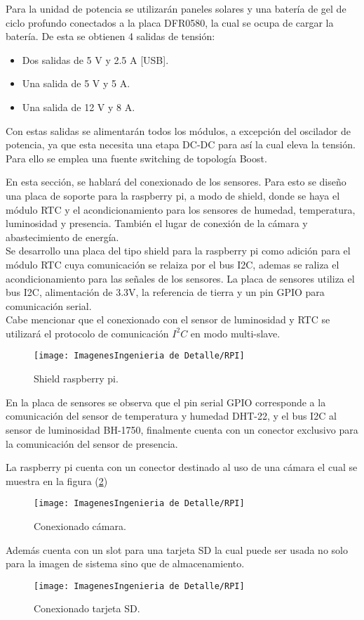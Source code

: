 
Para la unidad de potencia se utilizarán paneles solares y una batería de gel de ciclo profundo conectados a la placa DFR0580, la cual se ocupa de cargar la batería. De esta se obtienen 4 salidas de tensión:
\begin{itemize}
	\item Dos salidas de 5 V y 2.5 A [USB].
	\item Una salida de 5 V y 5 A.
	\item Una salida de 12 V y 8 A.
\end{itemize}

Con estas salidas se alimentarán todos los módulos, a excepción del oscilador de potencia, ya que esta necesita una etapa DC-DC para así la cual eleva la tensión. Para ello se emplea una fuente switching de topología Boost.


En esta sección, se hablará del conexionado de los sensores.
Para esto se diseño una placa de soporte para la raspberry pi, a modo de shield, donde se haya el módulo RTC y el acondicionamiento para los sensores de humedad, temperatura, luminosidad y presencia. También el lugar de conexión de la cámara y abastecimiento de energía.\\
Se desarrollo una placa del tipo shield para la raspberry pi como adición para el módulo RTC cuya comunicación se relaiza por el bus I2C, ademas se raliza el acondicionamiento para las señales de los sensores. La placa de sensores utiliza el bus I2C, alimentación de 3.3V, la referencia de tierra y un pin GPIO para comunicación serial.\\
Cabe mencionar que el conexionado con el sensor de luminosidad y RTC se utilizará el protocolo de comunicación $I^2C$ en modo multi-slave.

\begin{figure}[H]
	\centering
	\texttt{[image: ImagenesIngenieria de Detalle/RPI]}		
	\caption{Shield raspberry pi.}
	\label{fig:conexionado_Rpi}
\end{figure}

En la placa de sensores se observa que el pin serial GPIO corresponde a la comunicación del sensor de temperatura y humedad DHT-22, y el bus I2C al sensor de luminosidad BH-1750, finalmente cuenta con un conector exclusivo para la comunicación del sensor de presencia.

La raspberry pi cuenta con un conector destinado al uso de una cámara el cual se muestra en la figura (\ref{fig:rpiFront})
\begin{figure}[H]
	\centering
	\texttt{[image: ImagenesIngenieria de Detalle/RPI]}		
	\caption{Conexionado cámara.}
	\label{fig:rpiFront}
\end{figure}
Además cuenta con un slot para una tarjeta SD la cual puede ser usada no solo para la imagen de sistema sino que de almacenamiento.
\begin{figure}[H]
	\centering
	\texttt{[image: ImagenesIngenieria de Detalle/RPI]}		
	\caption{Conexionado tarjeta SD.}
	\label{fig:rpiBack}
\end{figure}

